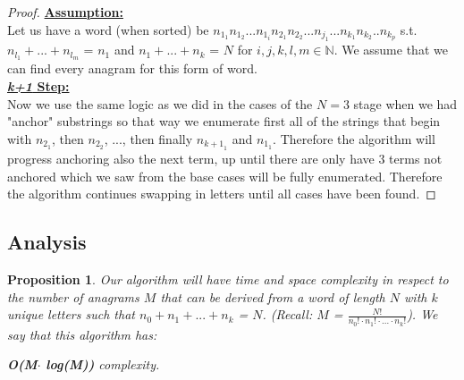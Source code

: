 \documentclass[12pt]{article}
\newtheorem{proposition}[theorem]{Proposition}
\begin{document}
\begin{proof}
\noindent \textbf{\underline{Assumption:}} \\
Let us have a word (when sorted) be $n_{1_1}$$n_{1_2}$...$n_{1_i}$$n_{2_1}$$n_{2_2}$...$n_{j_1}$...$n_{k_1}$$n_{k_2}$..$n_{k_p}$
s.t. $n_{l_1} + ... + n_{l_m}$ = $n_1$ and $n_1+...+n_k$ = $N$ for $i,j,k,l,m \in \mathbb{N}$. We assume that
we can find every anagram for this form of word. \\

\noindent \textbf{\underline{{\em k+1} Step:}} \\
Now we use the same logic as we did in the cases of the $N=3$ stage when we had "anchor" substrings so that way we
enumerate first all of the strings that begin with $n_{2_1}$, then $n_{2_2}$, ..., then finally $n_{{k+1}_1}$ and
$n_{1_1}$. Therefore the algorithm will progress anchoring also the next term, up until there are only have 3 terms not
anchored which we saw from the base cases will be fully enumerated. Therefore the algorithm continues swapping in
letters until all cases have been found.





\end{proof}


\subsection{Analysis}

\begin{proposition}
\label{numq}
Our algorithm will have time and space complexity in respect to the number of anagrams $M$ that can be derived
from a word of length $N$ with $k$ unique letters such that $n_0+n_1+...+n_k$ = $N$.
(Recall: $M$ = $\frac{N!}{n_0!\cdot n_1!\cdot ...\cdot n_k!}$). We say that this
algorithm has: \begin{center}\textbf{O(M$\cdot$ log(M))} complexity.\end{center}
\end{proposition}
\end{document}
